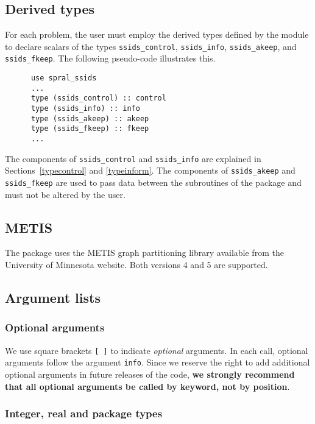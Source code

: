 \documentclass{spral}
\begin{document}
\subsection{Derived types} \label{derived types}

For each problem, the user must employ the derived types defined by the
module to declare scalars of the types
{\tt ssids\_control}, {\tt ssids\_info}, {\tt ssids\_akeep}, and {\tt ssids\_fkeep}.
The following pseudo-code illustrates this.
\begin{verbatim}
      use spral_ssids
      ...
      type (ssids_control) :: control
      type (ssids_info) :: info
      type (ssids_akeep) :: akeep
      type (ssids_fkeep) :: fkeep
      ...
\end{verbatim}
The components of {\tt ssids\_control} and {\tt ssids\_info} are explained
in Sections~\ref{typecontrol} and \ref{typeinform}.
The components of {\tt ssids\_akeep} and {\tt ssids\_fkeep} are used to pass
data between the subroutines of the package and must not be altered by the user.

\subsection{METIS}
The package uses the METIS graph partitioning library available from
the University of Minnesota website. Both versions 4 and 5 are supported.



\subsection{Argument lists}

\subsubsection{Optional arguments}\label{Optional arguments}

We use square brackets {\tt [ ]} to indicate {\it optional} arguments.
In each
call, optional arguments follow the argument {\tt info}.  Since we
reserve the right to add additional optional arguments in future
releases of the code, {\bf we strongly recommend that all optional
arguments be called by keyword, not by position}.

\subsubsection{Integer, real and package types}\label{Integer kinds}
\end{document}
